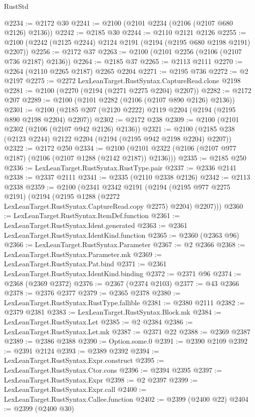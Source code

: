 \begin{lexlean}{RustStd}
\begin{coremodule}
{\begin{coremodule}
{{{{{{{{{{{{{{{{{{{{{{{{{{{{{{{{{{{{{{{{{{{{{{{{{{@2234 := @2172 @30
@2241 := @2100 (@2101 @2234 (@2106 (@2107 @680 @2126) @2136))
@2242 := @2185 @30
@2244 := @2110 @2121 @2126
@2255 := @2100 (@2242 (@2125 @2244) @2124 @2191 (@2194 (@2195 @680 @2198 @2191) @2207))
@2256 := @2172 @37
@2263 := @2100 (@2101 @2256 (@2106 (@2107 @736 @2187) @2136))
@2264 := @2185 @37
@2265 := @2113 @2111
@2270 := @2264 (@2110 @2265 @2187) @2265 @2204
@2271 := @2195 @736
@2272 := @2 @2197
@2275 := @2272 LexLeanTarget.RustSyntax.CaptureRead.clone @2198
@2281 := @2100 (@2270 (@2194 (@2271 @2275 @2204) @2207))
@2282 := @2172 @207
@2289 := @2100 (@2101 @2282 (@2106 (@2107 @890 @2126) @2136))
@2301 := @2100 (@2185 @207 (@2120 @2222) @2119 @2204 (@2194 (@2195 @890 @2198 @2204) @2207))
@2302 := @2172 @238
@2309 := @2100 (@2101 @2302 (@2106 (@2107 @942 @2126) @2136))
@2321 := @2100 (@2185 @238 (@2123 @2244) @2122 @2204 (@2194 (@2195 @942 @2198 @2204) @2207))
@2322 := @2172 @250
@2334 := @2100 (@2101 @2322 (@2106 (@2107 @977 @2187) (@2106 (@2107 @1288 (@2142 @2187)) @2136)))
@2335 := @2185 @250
@2336 := LexLeanTarget.RustSyntax.RustType.pair
@2337 := @2336 @2141
@2338 := @2337 @2111
@2341 := @2335 (@2110 @2338 @2126)
@2342 := @2113 @2338
@2359 := @2100
    (@2341
      @2342
      @2191
      (@2194
        (@2195 @977 @2275 @2191)
        (@2194 (@2195 @1288 (@2272 LexLeanTarget.RustSyntax.CaptureRead.copy @2275) @2204) @2207)))
@2360 := LexLeanTarget.RustSyntax.ItemDef.function
@2361 := LexLeanTarget.RustSyntax.Ident.generated
@2363 := @2361 LexLeanTarget.RustSyntax.IdentKind.function
@2365 := @2360 (@2363 @96)
@2366 := LexLeanTarget.RustSyntax.Parameter
@2367 := @2 @2366
@2368 := LexLeanTarget.RustSyntax.Parameter.mk
@2369 := LexLeanTarget.RustSyntax.Pat.bind
@2371 := @2361 LexLeanTarget.RustSyntax.IdentKind.binding
@2372 := @2371 @96
@2374 := @2368 (@2369 @2372)
@2376 := @2367 (@2374 @2103)
@2377 := @43 @2366
@2378 := @2376 @2377
@2379 := @2365 @2378
@2380 := LexLeanTarget.RustSyntax.RustType.fallible
@2381 := @2380 @2111
@2382 := @2379 @2381
@2383 := LexLeanTarget.RustSyntax.Block.mk
@2384 := LexLeanTarget.RustSyntax.Let
@2385 := @2 @2384
@2386 := LexLeanTarget.RustSyntax.Let.mk
@2387 := @2371 @22
@2388 := @2369 @2387
@2389 := @2386 @2388
@2390 := Option.some.{0}
@2391 := @2390 @2109
@2392 := @2391 @2124
@2393 := @2389 @2392
@2394 := LexLeanTarget.RustSyntax.Expr.construct
@2395 := LexLeanTarget.RustSyntax.Ctor.cons
@2396 := @2394 @2395
@2397 := LexLeanTarget.RustSyntax.Expr
@2398 := @2 @2397
@2399 := LexLeanTarget.RustSyntax.Expr.call
@2400 := LexLeanTarget.RustSyntax.Callee.function
@2402 := @2399 (@2400 @22)
@2404 := @2399 (@2400 @30)
}}}}}}}}}}}}}}}}}}}}}}}}}}}}}}}}}}}}}}}}}}}}}}}}}}
\end{coremodule}}
\end{coremodule}
\end{lexlean}
